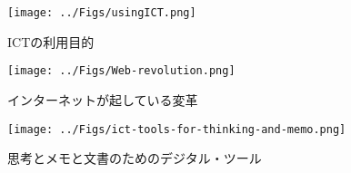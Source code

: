 \documentclass[dvipdfmx,11pat]{jarticle}
\begin{document}
\begin{figure}[htbp]
\centering
\texttt{[image: ../Figs/usingICT.png]}
\caption{ICTの利用目的}
\end{figure}

\vspace{3cm}

\begin{figure}[htbp]
\centering
\texttt{[image: ../Figs/Web-revolution.png]}
\caption{インターネットが起している変革}
\end{figure}

\begin{figure}[htbp]
\centering
\texttt{[image: ../Figs/ict-tools-for-thinking-and-memo.png]}
\caption{思考とメモと文書のためのデジタル・ツール}
\end{figure}
\end{document}
